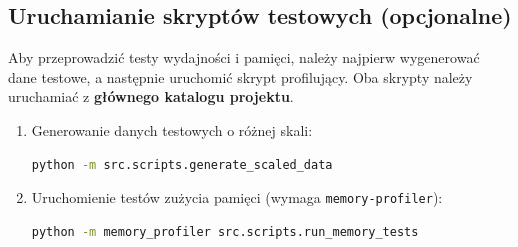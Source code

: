 \documentclass[12pt,a4paper]{article}
\begin{document}
\subsection{Uruchamianie skryptów testowych (opcjonalne)}
Aby przeprowadzić testy wydajności i pamięci, należy najpierw wygenerować dane testowe, a następnie uruchomić skrypt profilujący. Oba skrypty należy uruchamiać z \textbf{głównego katalogu projektu}.

\begin{enumerate}[label*=\arabic*.]
    \item Generowanie danych testowych o różnej skali:
    \begin{lstlisting}[language=bash]
python -m src.scripts.generate_scaled_data
    \end{lstlisting}
    \item Uruchomienie testów zużycia pamięci (wymaga \texttt{memory-profiler}):
    \begin{lstlisting}[language=bash]
python -m memory_profiler src.scripts.run_memory_tests
    \end{lstlisting}
\end{enumerate}


\printbibliography[heading=bibintoc]
\end{document}

